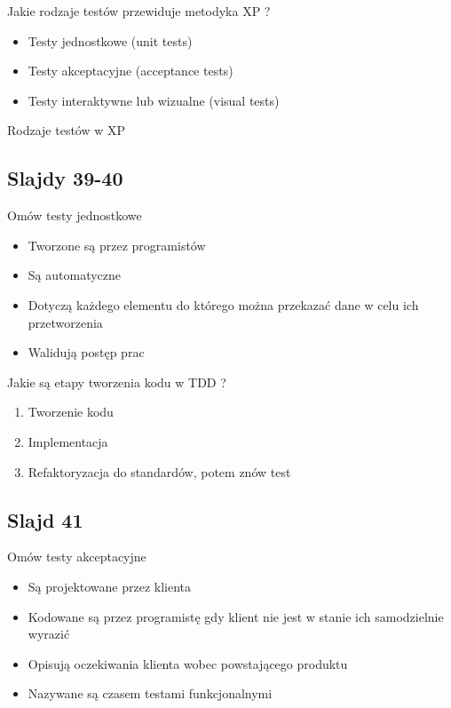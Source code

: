 \documentclass[a4paper,15pt]{article}
\newcommand{\question}[2]{
    \begin{tcolorbox}[colback=mRed!5!white,colframe=mRed,title={Kolokwium 2018 #1}]
        #2
    \end{tcolorbox}
}
\begin{document}
\begin{framed}
Jakie rodzaje testów przewiduje metodyka XP ?
\end{framed}
\begin{itemize}
\item Testy jednostkowe (unit tests)
\item Testy akceptacyjne (acceptance tests)
\item Testy interaktywne lub wizualne (visual tests)
\end{itemize}
\question{}{
Rodzaje testów w XP}

\subsection{Slajdy 39-40}
\begin{framed}
Omów testy jednostkowe
\end{framed}
\begin{itemize}
\item Tworzone są przez programistów 
\item Są automatyczne
\item Dotyczą każdego elementu do którego można przekazać dane w celu ich przetworzenia
\item Walidują postęp prac 
\end{itemize}

\begin{framed}
Jakie są etapy tworzenia kodu w TDD ?
\end{framed}
\begin{enumerate}
\item Tworzenie kodu
\item Implementacja
\item Refaktoryzacja do standardów, potem znów test
\end{enumerate}

\subsection{Slajd 41}
\begin{framed}
Omów testy akceptacyjne
\end{framed}
\begin{itemize}
\item Są projektowane przez klienta
\item Kodowane są przez programistę gdy klient nie jest w stanie ich samodzielnie wyrazić
\item Opisują oczekiwania klienta wobec powstającego produktu
\item Nazywane są czasem testami funkcjonalnymi 
\end{itemize}
\end{document}
